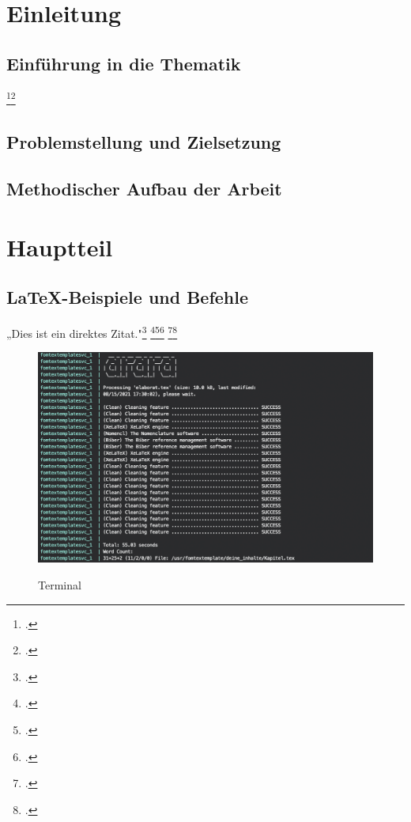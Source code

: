 \section{Einleitung}
\subsection{Einführung in die Thematik}
\blindtext{}
\blindtext\footcite[Vgl.][]{mswpf}\footcite[Vgl.][19]{sadtler_rechtskonformes_2017}

\subsection{Problemstellung und Zielsetzung}
\blindtext

\subsection{Methodischer Aufbau der Arbeit}
\blindtext

\section{Hauptteil}
\subsection{LaTeX-Beispiele und Befehle}
„Dies ist ein direktes Zitat."\footcite[][224]{mertens_digitalisierung_2017} \blindtext\footcite[Vgl.][]{msdatabind}\footcite[Vgl.][]{lambda}\footcite[Vgl.][34]{Digitaloekonomie}
\blindenumerate
\blindtext\footcite[Vgl.][415-426]{Tanenbaum2016}\footcite[Vgl.][223]{mandl_internet_2019}

\begin{figure}[!htb]
    \caption{Terminal}
    \includegraphics[width=1\textwidth]{.github/terminal}
    \captionsetup{width=1\textwidth}
    \label{abb_bsp}
\end{figure}
\blindtext

